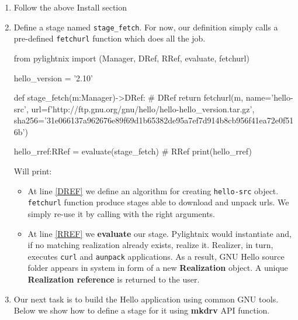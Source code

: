 \documentclass{article}
\begin{document}
\begin{enumerate}

  \item Follow the above Install section

  \item Define a stage named \texttt{stage\_fetch}. For now, our definition
    simply calls a pre-defined \texttt{fetchurl} function which does all the
    job.

    \begin{pyblock}[stdout][numbers=left]
    from pylightnix import (Manager, DRef, RRef, evaluate, fetchurl)

    hello_version = '2.10'

    def stage_fetch(m:Manager)->DRef: # DRef \label{DREF}
      return fetchurl(m,
        name='hello-src',
        url=f'http://ftp.gnu.org/gnu/hello/hello-{hello_version}.tar.gz',
        sha256='31e066137a962676e89f69d1b65382de95a7ef7d914b8cb956f41ea72e0f516b')

    hello_rref:RRef = evaluate(stage_fetch)  # RRef \label{RREF}
    print(hello_rref)
    \end{pyblock}

    Will print:
    \par
    \stdoutpythontex
    \par

    \begin{itemize}

      \item At line \ref{DREF} we define an algorithm for creating
        \texttt{hello-src} object. \texttt{fetchurl} function produce stages
        able to download and unpack urls. We simply re-use it by calling with
        the right arguments.

      \item At line \ref{RREF} we \textbf{evaluate} our stage. Pylightnix would
        instantiate and, if no matching realization already exists, realize it.
        Realizer, in turn, executes \texttt{curl} and \texttt{aunpack}
        applications. As a result, GNU Hello source folder appears in system in
        form of a new \textbf{Realization} object. A unique \textbf{Realization
        reference} is returned to the user.

    \end{itemize}

  \item Our next task is to build the Hello application using common GNU tools.
    Below we show how to define a stage for it using \textbf{mkdrv} API
    function.


\end{enumerate}
\end{document}
